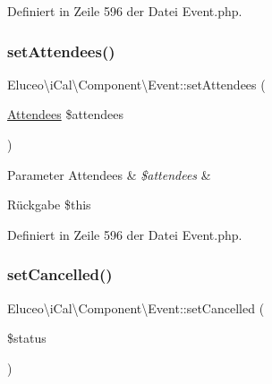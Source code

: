Definiert in Zeile 596 der Datei Event.\+php.

\mbox{\label{class_eluceo_1_1i_cal_1_1_component_1_1_event_a3862ad4e3fc4d0f8d7086f4889b11bd7}} 
\subsubsection{\texorpdfstring{set\+Attendees()}{setAttendees()}\hspace{0.1cm}{\footnotesize\ttfamily [3/3]}}
{\footnotesize\ttfamily Eluceo\textbackslash{}i\+Cal\textbackslash{}\+Component\textbackslash{}\+Event\+::set\+Attendees (\begin{DoxyParamCaption}\item[{\mbox{\hyperlink{class_eluceo_1_1i_cal_1_1_property_1_1_event_1_1_attendees}{Attendees}}}]{\$attendees }\end{DoxyParamCaption})}


\begin{DoxyParams}[1]{Parameter}
Attendees & {\em \$attendees} & \\
\hline
\end{DoxyParams}
\begin{DoxyReturn}{Rückgabe}
\$this 
\end{DoxyReturn}


Definiert in Zeile 596 der Datei Event.\+php.

\mbox{\label{class_eluceo_1_1i_cal_1_1_component_1_1_event_a1a81af119a481d672fe0f4ad2610a502}} 
\subsubsection{\texorpdfstring{set\+Cancelled()}{setCancelled()}\hspace{0.1cm}{\footnotesize\ttfamily [1/3]}}
{\footnotesize\ttfamily Eluceo\textbackslash{}i\+Cal\textbackslash{}\+Component\textbackslash{}\+Event\+::set\+Cancelled (\begin{DoxyParamCaption}\item[{}]{\$status }\end{DoxyParamCaption})}


